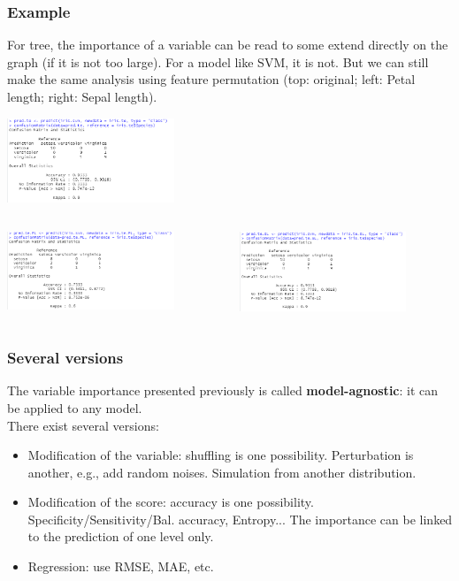 \begin{frame}
\frametitle{Example}
\small
For tree, the importance of a variable can be read to some extend directly on the graph (if it is not too large). For a model like SVM, it is not. But we can still make the same analysis using feature permutation (top: original; left: Petal length; right: Sepal length).
\\
\normalsize
\begin{center}
\includegraphics[width=5cm]{../Graphs/VarImp_iris_acc_svm.png}
\end{center}
\begin{columns}
\begin{column}{0.5\textwidth}
\includegraphics[width=5cm]{../Graphs/VarImp_iris_acc_svm_PL.png}
\end{column}
\begin{column}{0.5\textwidth}
\includegraphics[width=5cm]{../Graphs/VarImp_iris_acc_svm_SL.png}
\end{column}
\end{columns}
\end{frame}
\begin{frame}
\frametitle{Several versions}
The variable importance presented previously is called {\bf model-agnostic}: it can be applied to any model.\\ 
\vspace{0.3cm}
There exist several versions:
\begin{itemize}
\item Modification of the variable: shuffling is one possibility. Perturbation is another, e.g., add random noises. Simulation from another distribution.
\item Modification of the score: accuracy is one possibility. Specificity/Sensitivity/Bal. accuracy, Entropy... The importance can be linked to the prediction of one level only. 
\item Regression: use RMSE, MAE, etc.
\end{itemize}
\end{frame}
